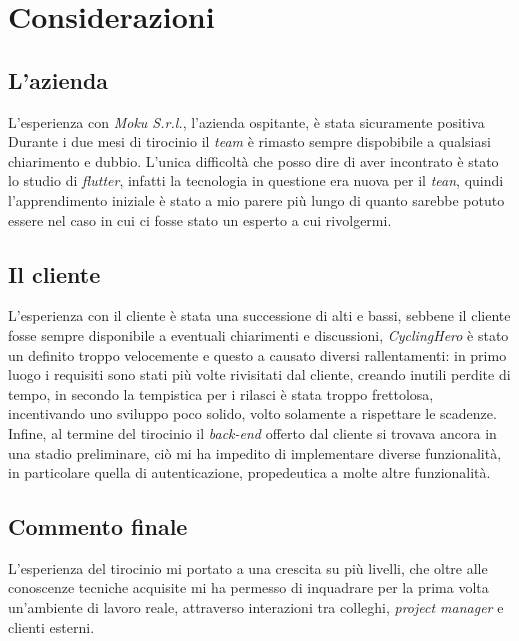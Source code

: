 \section{Considerazioni}
\subsection{L'azienda}
L'esperienza con \textit{Moku S.r.l.}, l'azienda ospitante, è stata sicuramente positiva Durante i due mesi di tirocinio il \textit{team} è rimasto sempre dispobibile a qualsiasi chiarimento e dubbio. L'unica difficoltà che posso dire di aver incontrato è stato lo studio di \textit{flutter}, infatti la tecnologia in questione era nuova per il \textit{tean}, quindi l'apprendimento iniziale è stato a mio parere più lungo di quanto sarebbe potuto essere nel caso in cui ci fosse stato un esperto a cui rivolgermi.

\subsection{Il cliente}
L'esperienza con il cliente è stata una successione di alti e bassi, sebbene il cliente fosse sempre disponibile a eventuali chiarimenti e discussioni, \textit{CyclingHero} è stato un definito troppo velocemente e questo a causato diversi rallentamenti: in primo luogo i requisiti sono stati più volte rivisitati dal cliente, creando inutili perdite di tempo, in secondo la tempistica per i rilasci è stata troppo frettolosa, incentivando uno sviluppo poco solido, volto solamente a rispettare le scadenze. Infine, al termine del tirocinio il \textit{back-end} offerto dal cliente si trovava ancora in una stadio preliminare, ciò mi ha impedito di implementare diverse funzionalità, in particolare quella di autenticazione, propedeutica a molte altre funzionalità.

\subsection{Commento finale}
L'esperienza del tirocinio mi portato a una crescita su più livelli, che oltre alle conoscenze tecniche acquisite mi ha permesso di inquadrare per la prima volta un'ambiente di lavoro reale, attraverso interazioni tra colleghi, \textit{project manager} e clienti esterni.